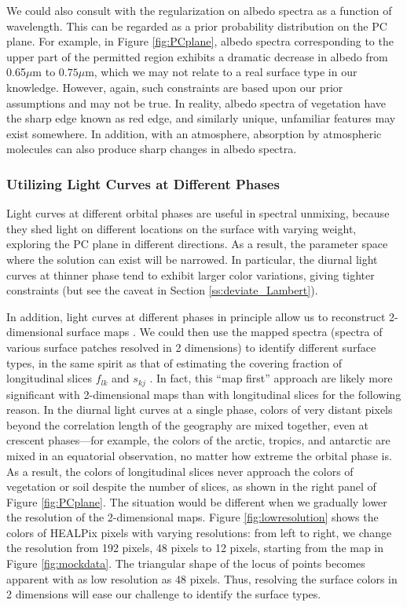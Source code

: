 \documentclass[iop,numberedappendix,apj]{emulateapj}
\begin{document}
We could also consult with the regularization on albedo spectra as a function of wavelength. 
This can be regarded as a prior probability distribution on the PC plane. 
For example, in Figure \ref{fig:PCplane}, albedo spectra corresponding to the upper part of the permitted region exhibits a dramatic decrease in albedo from 0.65$\mu $m to $0.75\mu $m, which we may not relate to a real surface type in our knowledge. 
However, again, such constraints are based upon our prior assumptions and may not be true. 
In reality, albedo spectra of vegetation have the sharp edge known as red edge, and similarly unique, unfamiliar features may exist somewhere. 
In addition, with an atmosphere, absorption by atmospheric molecules can also produce sharp changes in albedo spectra. 


\subsubsection{Utilizing Light Curves at Different Phases}

Light curves at different orbital phases are useful in spectral unmixing, because they shed light on different locations on the surface with varying weight, exploring the PC plane in different directions. 
As a result, the parameter space where the solution can exist will be narrowed.  
In particular, the diurnal light curves at thinner phase tend to exhibit larger color variations, giving tighter constraints (but see the caveat in Section \ref{ss:deviate_Lambert}). 

In addition, light curves at different phases in principle allow us to reconstruct 2-dimensional surface maps  \citep{Kawahara2010,Kawahara2011,Fujii2012}. 
We could then use the mapped spectra (spectra of various surface patches resolved in 2 dimensions) to identify different surface types, in the same spirit as that of estimating the covering fraction of longitudinal slices $f_{lk}$ and $s_{kj}$ . 
In fact, this ``map first'' approach are likely more significant with 2-dimensional maps than with longitudinal slices for the following reason. 
In the diurnal light curves at a single phase, colors of very distant pixels beyond the correlation length of the geography are mixed together, even at crescent phases---for example, the colors of the arctic, tropics, and antarctic are mixed in an equatorial observation, no matter how extreme the orbital phase is. 
As a result, the colors of longitudinal slices never approach the colors of vegetation or soil despite the number of slices, as shown in the right panel of Figure \ref{fig:PCplane}. 
The situation would be different when we gradually lower the resolution of the 2-dimensional maps. 
Figure \ref{fig:lowresolution} shows the colors of HEALPix pixels \citep{Gorski2005} with varying resolutions: from left to right, we change the resolution from 192 pixels, 48 pixels to 12 pixels, starting from the map in Figure \ref{fig:mockdata}. 
The triangular shape of the locus of points becomes apparent with as low resolution as 48 pixels. 
Thus, resolving the surface colors in 2 dimensions will ease our challenge to identify the surface types. 
\end{document}
